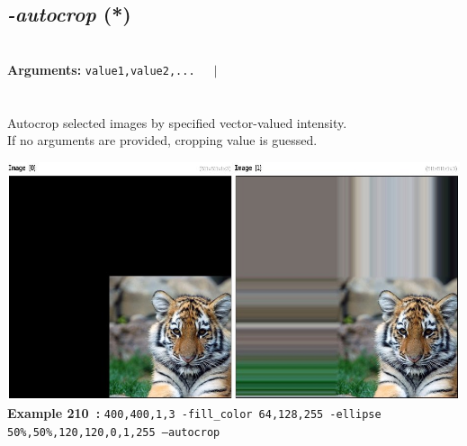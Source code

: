 \documentclass[a4paper,11pt,twoside]{book}
\begin{document}
\subsection{\emph{-autocrop} (*)}\vspace*{-0.5em}
~\\\textbf{Arguments: } 
{\small \texttt{value1,value2,...}}~~~$|$\\
\\~\\
Autocrop selected images by specified vector-valued intensity.
~\\If no arguments are provided, cropping value is guessed.
\begin{center}\includegraphics[keepaspectratio=true,height=7cm,width=\textwidth]{img/gmic_def210.jpg}\\
{\footnotesize \textbf{Example 210~:} \texttt{400,400,1,3 -fill\_color 64,128,255 -ellipse 50\%,50\%,120,120,0,1,255 --autocrop}}
\end{center}
\end{document}
